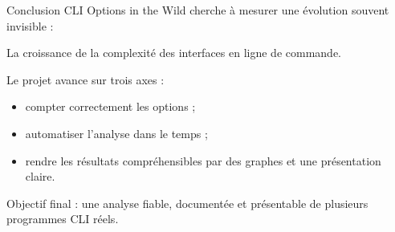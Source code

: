 \documentclass[10pt,aspectratio=169]{beamer}
\begin{document}
\begin{frame}{Conclusion}
  CLI Options in the Wild cherche à mesurer une évolution souvent invisible :

  \vspace{0.3cm}
  \begin{block}{}
    La croissance de la complexité des interfaces en ligne de commande.
  \end{block}

  \vspace{0.3cm}
  Le projet avance sur trois axes :
  \begin{itemize}
    \item compter correctement les options ;
    \item automatiser l'analyse dans le temps ;
    \item rendre les résultats compréhensibles par des graphes et une présentation claire.
  \end{itemize}

  \vspace{0.2cm}
  Objectif final : une analyse fiable, documentée et présentable de plusieurs programmes CLI réels.
\end{frame}
\end{document}
